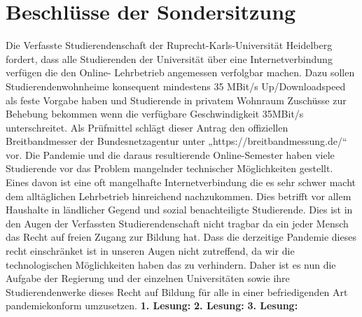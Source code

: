 \section{Beschlüsse der Sondersitzung}
    {
        Die Verfasste Studierendenschaft der Ruprecht-Karls-Universität Heidelberg fordert,
        dass alle Studierenden der Universität über eine Internetverbindung verfügen die den
        Online- Lehrbetrieb angemessen verfolgbar machen. Dazu sollen
        Studierendenwohnheime konsequent mindestens 35 MBit/s Up/Downloadspeed als feste
        Vorgabe haben und Studierende in privatem Wohnraum Zuschüsse zur Behebung
        bekommen wenn die verfügbare Geschwindigkeit 35MBit/s unterschreitet. Als
        Prüfmittel schlägt dieser Antrag den offiziellen Breitbandmesser der
        Bundesnetzagentur
        unter „https://breitbandmessung.de/“ vor.
    }{
        Die Pandemie und die daraus resultierende Online-Semester haben viele Studierende vor
        das Problem mangelnder technischer Möglichkeiten gestellt. Eines davon ist eine oft
        mangelhafte Internetverbindung die es sehr schwer macht dem alltäglichen Lehrbetrieb
        hinreichend nachzukommen. Dies betrifft vor allem Haushalte in ländlicher Gegend und
        sozial benachteiligte Studierende. Dies ist in den Augen der Verfassten
        Studierendenschaft nicht tragbar da ein jeder Mensch das Recht auf freien Zugang zur
        Bildung hat. Dass die derzeitige Pandemie dieses recht einschränket ist in unseren Augen
        nicht zutreffend, da wir die technologischen Möglichkeiten haben das zu verhindern.
        Daher ist es nun die Aufgabe der Regierung und der einzelnen Universitäten sowie ihre
        Studierendenwerke dieses Recht auf Bildung für alle in einer befriedigenden Art
        pandemiekonform umzusetzen.
    }{
        \textbf{1. Lesung:}
        \ul{
        }
        \textbf{2. Lesung:}
        \ul{
        }
        \textbf{3. Lesung:}
        \ul{}
    }{
    }
